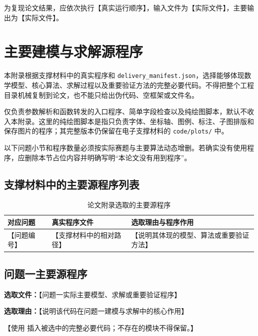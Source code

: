 为复现论文结果，应依次执行【真实运行顺序】，输入文件为【实际文件】，主要输出为【实际文件】。

\clearpage
\section{主要建模与求解源程序}

本附录根据支撑材料中的真实程序和 \texttt{delivery\_manifest.json}，选择能够体现数学模型、核心算法、求解过程以及重要验证方法的完整必要代码。不得把整个工程目录机械复制到论文，也不能只给出伪代码、空框架或文件名。

仅负责参数解析和函数转发的入口程序、简单字段检查以及纯绘图脚本，默认不收入本附录。这里的纯绘图脚本是指只负责字体、坐标轴、图例、标注、子图排版和保存图片的程序；其完整版本仍保留在电子支撑材料的 \texttt{code/plots/} 中。

以下问题小节和程序数量必须按实际赛题与主要算法动态增删。若确实没有使用程序，应删除本节占位内容并明确写明“本论文没有用到程序”。

\subsection{支撑材料中的主要源程序列表}

\begin{table}[htbp]
  \centering
  \caption{论文附录选取的主要源程序}
  \begin{tabular}{p{}p{}p{}}
    \toprule
    \textbf{对应问题} & \textbf{真实程序文件} & \textbf{选取理由与程序作用} \\
    \midrule
    【问题编号】 & 【支撑材料中的相对路径】 & 【说明其体现的模型、算法或重要验证方法】 \\
    \bottomrule
  \end{tabular}
  \label{tab:appendix-main-code}
\end{table}

\subsection{问题一主要源程序}

\noindent\textbf{选取文件：}【问题一实际主要模型、求解或重要验证程序】

\noindent\textbf{选取理由：}【说明该代码在问题一建模与求解中的核心作用】

\noindent 【使用 \verb|| 插入被选中的完整必要代码；不存在的模块不得保留。】
% 
% 

